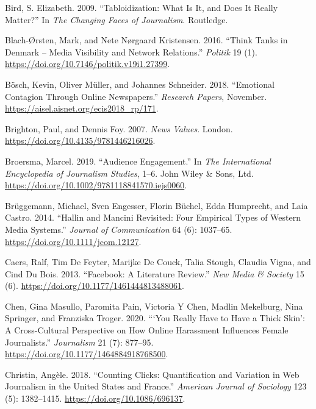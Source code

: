 \documentclass[
]{article}
\newlength{\cslhangindent}
\newlength{\cslentryspacingunit} %
\newenvironment{CSLReferences}[2] %
 {%
  \setlength{\parindent}{0pt}
  \ifodd #1
  \let\oldpar\par
  \def\par{\hangindent=\cslhangindent\oldpar}
  \fi
  \setlength{\parskip}{#2\cslentryspacingunit}
 }%
 {}
\begin{document}
\begin{CSLReferences}{1}{0}
\leavevmode{}%
Bird, S. Elizabeth. 2009. {``Tabloidization: {What} Is It, and {Does} It
{Really} {Matter}?''} In \emph{The {Changing} {Faces} of {Journalism}}.
Routledge.

\leavevmode{}%
Blach-Ørsten, Mark, and Nete Nørgaard Kristensen. 2016. {``Think Tanks
in {Denmark} -- {Media} Visibility and {Network} {Relations}.''}
\emph{Politik} 19 (1).
\url{https://doi.org/10.7146/politik.v19i1.27399}.

\leavevmode{}%
Bösch, Kevin, Oliver Müller, and Johannes Schneider. 2018. {``Emotional
{Contagion} {Through} {Online} {Newspapers}.''} \emph{Research Papers},
November. \url{https://aisel.aisnet.org/ecis2018_rp/171}.

\leavevmode{}%
Brighton, Paul, and Dennis Foy. 2007. \emph{News {Values}}. London.
\url{https://doi.org/10.4135/9781446216026}.

\leavevmode{}%
Broersma, Marcel. 2019. {``Audience {Engagement}.''} In \emph{The
{International} {Encyclopedia} of {Journalism} {Studies}}, 1--6. John
Wiley \& Sons, Ltd.
\url{https://doi.org/10.1002/9781118841570.iejs0060}.

\leavevmode{}%
Brüggemann, Michael, Sven Engesser, Florin Büchel, Edda Humprecht, and
Laia Castro. 2014. {``Hallin and {Mancini} {Revisited}: {Four}
{Empirical} {Types} of {Western} {Media} {Systems}.''} \emph{Journal of
Communication} 64 (6): 1037--65.
\url{https://doi.org/10.1111/jcom.12127}.

\leavevmode{}%
Caers, Ralf, Tim De Feyter, Marijke De Couck, Talia Stough, Claudia
Vigna, and Cind Du Bois. 2013. {``Facebook: {A} Literature Review.''}
\emph{New Media \& Society} 15 (6).
\url{https://doi.org/10.1177/1461444813488061}.

\leavevmode{}%
Chen, Gina Masullo, Paromita Pain, Victoria Y Chen, Madlin Mekelburg,
Nina Springer, and Franziska Troger. 2020. {``{`{You} Really Have to
Have a Thick Skin'}: {A} Cross-Cultural Perspective on How Online
Harassment Influences Female Journalists.''} \emph{Journalism} 21 (7):
877--95. \url{https://doi.org/10.1177/1464884918768500}.

\leavevmode{}%
Christin, Angèle. 2018. {``Counting {Clicks}: {Quantification} and
{Variation} in {Web} {Journalism} in the {United} {States} and
{France}.''} \emph{American Journal of Sociology} 123 (5): 1382--1415.
\url{https://doi.org/10.1086/696137}.


\end{CSLReferences}
\end{document}
